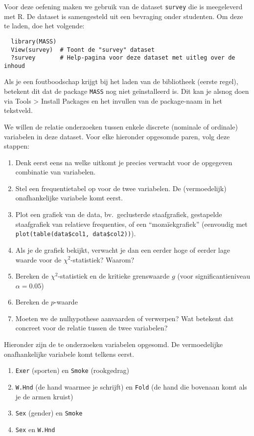 \begin{exercise}
  \label{ex:chisq-survey}
  Voor deze oefening maken we gebruik van de dataset \texttt{survey} die is meegeleverd met R. De dataset is samengesteld uit een bevraging onder studenten. Om deze te laden, doe het volgende:
  
  \begin{lstlisting}
  library(MASS)
  View(survey)  # Toont de "survey" dataset
  ?survey       # Help-pagina voor deze dataset met uitleg over de inhoud
  \end{lstlisting}
  
  Als je een foutboodschap krijgt bij het laden van de bibliotheek (eerste regel), betekent dit dat de package \texttt{MASS} nog niet geïnstalleerd is. Dit kan je alsnog doen via Tools > Install Packages en het invullen van de package-naam in het tekstveld.
  
  We willen de relatie onderzoeken tussen enkele discrete (nominale of ordinale) variabelen in deze dataset. Voor elke hieronder opgesomde paren, volg deze stappen:
  
  \begin{enumerate}[label=(\alph*)]
    \item Denk eerst eens na welke uitkomt je precies verwacht voor de opgegeven combinatie van variabelen.
    \item Stel een frequentietabel op voor de twee variabelen. De (vermoedelijk) onafhankelijke variabele komt eerst.
    \item Plot een grafiek van de data, bv.~geclusterde staafgrafiek, gestapelde staafgrafiek van relatieve frequenties, of een ``mozaïekgrafiek'' (eenvoudig met \texttt{plot(table(data\$col1, data\$col2))}).
    \item Als je de grafiek bekijkt, verwacht je dan een eerder hoge of eerder lage waarde voor de $\chi^2$-statistiek? Waarom?
    \item Bereken de $\chi^2$-statistiek en de kritieke grenswaarde $g$ (voor significantieniveau $\alpha = 0.05$)
    \item Bereken de $p$-waarde
    \item Moeten we de nulhypothese aanvaarden of verwerpen? Wat betekent dat concreet voor de relatie tussen de twee variabelen?
  \end{enumerate}
  
  Hieronder zijn de te onderzoeken variabelen opgesomd. De vermoedelijke onafhankelijke variabele komt telkens eerst.
  
  \begin{enumerate}
    \item \texttt{Exer} (sporten) en \texttt{Smoke} (rookgedrag)
    \item \texttt{W.Hnd} (de hand waarmee je schrijft) en \texttt{Fold} (de hand die bovenaan komt als je de armen kruist)
    \item \texttt{Sex} (gender) en \texttt{Smoke}
    \item \texttt{Sex} en \texttt{W.Hnd}
  \end{enumerate}
\end{exercise}

